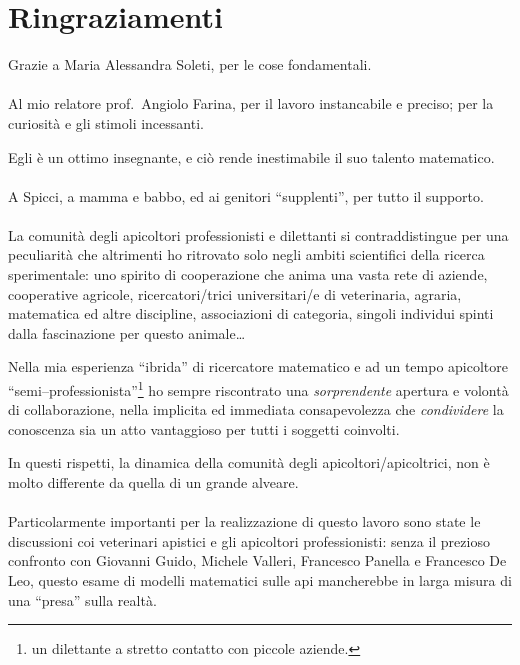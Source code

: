 \cleardoublepage
{} %
\section*{Ringraziamenti}
Grazie a Maria Alessandra Soleti, per le cose fondamentali.

\paragraph{}
Al mio relatore prof.~Angiolo Farina, per il lavoro instancabile e preciso; per la curiosità e gli stimoli incessanti.

Egli è un ottimo insegnante, e ciò rende inestimabile il suo talento matematico.

\paragraph{}
A Spicci, a mamma e babbo, ed ai genitori ``supplenti'', per tutto il supporto.

\paragraph{}
La comunità degli apicoltori professionisti e dilettanti si contraddistingue per una peculiarità
che altrimenti ho ritrovato solo negli ambiti scientifici della ricerca sperimentale: uno spirito di cooperazione
che anima una vasta rete di aziende, cooperative agricole, ricercatori/trici universitari/e di veterinaria, agraria,
matematica ed altre discipline, associazioni di categoria, singoli individui spinti dalla fascinazione per
questo animale\dots

Nella mia esperienza ``ibrida'' di ricercatore matematico e ad un tempo
apicoltore ``semi--professionista''\footnote{\ie un dilettante a stretto contatto con piccole aziende.}
ho sempre riscontrato una \emph{sorprendente} apertura e volontà di collaborazione, nella implicita ed immediata
consapevolezza che \emph{condividere} la conoscenza sia un atto vantaggioso per tutti i soggetti coinvolti.

In questi rispetti, la dinamica della comunità degli apicoltori/apicoltrici, non è molto differente da
quella di un grande alveare.

\paragraph{}
Particolarmente importanti per la realizzazione di questo lavoro sono state le discussioni coi veterinari apistici
e gli apicoltori professionisti: senza il prezioso confronto con Giovanni Guido, Michele Valleri, Francesco Panella
e Francesco De Leo, questo esame di modelli matematici sulle api mancherebbe in larga misura di una ``presa'' sulla realtà.



